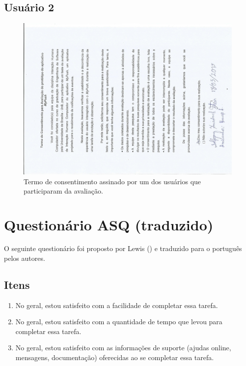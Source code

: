 \begin{anexosenv}
   \section*{Usuário 2}
    \begin{figure}[!htbp]
      \centering
      \includegraphics[scale=0.6, angle=-90]{editaveis/figuras/termousuario2}
      \caption{Termo de consentimento assinado por um dos usuários que participaram da avaliação.}
      \label{termo_consentimento_1}
    \end{figure}
	
  \chapter{Questionário ASQ (traduzido)}
      
      O seguinte questionário foi proposto por Lewis (\citeyear{lewis91}) e traduzido para o português pelos autores.
      
      \section*{Itens}
	
	\begin{enumerate}
	  \item No geral, estou satisfeito com a facilidade de completar essa tarefa.
	  \item No geral, estou satisfeito com a quantidade de tempo que levou para completar essa tarefa.
	  \item No geral, estou satisfeito com as informações de suporte (ajudas online, mensagens, documentação)
	    oferecidas ao se completar essa tarefa.
	\end{enumerate}
      

\end{anexosenv}
